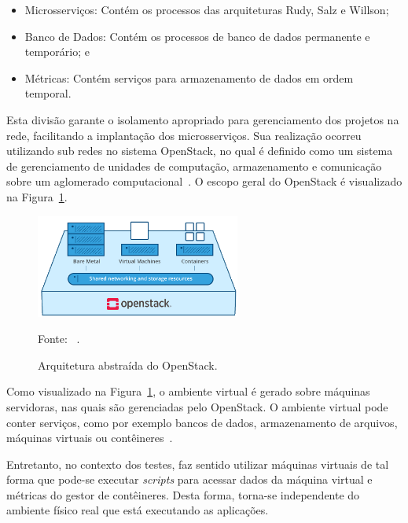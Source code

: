 \begin{itemize}
  \item Microsserviços: Contém os processos das arquiteturas Rudy, Salz e Willson;
  \item Banco de Dados: Contém os processos de banco de dados permanente e temporário; e
  \item Métricas: Contém serviços para armazenamento de dados em ordem temporal.
\end{itemize}



Esta divisão garante o isolamento apropriado para gerenciamento dos projetos na rede, facilitando a implantação dos microsserviços.
%
Sua realização ocorreu utilizando sub redes no sistema OpenStack, no qual é definido como um sistema de gerenciamento de unidades de computação, armazenamento e comunicação sobre um aglomerado computacional~\cite{open_stack_bib}.
%
O escopo geral do OpenStack é visualizado na Figura~\ref{fig:arch_open_stack}.



\begin{figure}[htb!]
  \caption{Arquitetura abstraída do OpenStack.}
    \vspace{-0.3cm}
  \label{fig:arch_open_stack}
  \includegraphics[width=0.6\textwidth]{figuras/ambiente/openstack.png}
  \centering

  Fonte: ~\cite{open_stack_bib}.
\end{figure}



Como visualizado na Figura~\ref{fig:arch_open_stack}, o ambiente virtual é gerado sobre máquinas servidoras, nas quais são gerenciadas pelo OpenStack.
%
O ambiente virtual pode conter serviços, como por exemplo bancos de dados, armazenamento de arquivos, máquinas virtuais ou contêineres~\cite{open_stack_bib}.



Entretanto, no contexto dos testes, faz sentido utilizar máquinas virtuais de tal forma que pode-se executar \textit{scripts} para acessar dados da máquina virtual e métricas do gestor de contêineres.
%
Desta forma, torna-se independente do ambiente físico real que está executando as aplicações.



